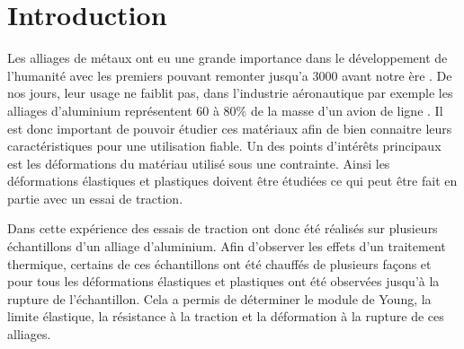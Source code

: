 \section{Introduction}
Les alliages de métaux ont eu une grande importance dans le développement de l'humanité avec les premiers pouvant remonter jusqu'a 3000 avant notre ère \cite{vieux}. De nos jours, leur usage ne faiblit pas, dans l'industrie aéronautique par exemple les alliages d'aluminium représentent 60 à 80\% de la masse d'un avion de ligne \cite{aluminium}. Il est donc important de pouvoir étudier ces matériaux afin de bien connaitre leurs caractéristiques pour une utilisation fiable. Un des points d'intérêts principaux est les déformations du matériau utilisé sous une contrainte. Ainsi les déformations élastiques et plastiques doivent être étudiées ce qui peut être fait en partie avec un essai de traction.

Dans cette expérience des essais de traction ont donc été réalisés sur plusieurs échantillons d'un alliage d'aluminium. Afin d'observer les effets d'un traitement thermique, certains de ces échantillons ont été chauffés de plusieurs façons et pour tous les déformations élastiques et plastiques ont été observées jusqu'à la rupture de l'échantillon. Cela a permis de déterminer le module de Young, la limite élastique, la résistance à la traction et la déformation à la rupture de ces alliages.


